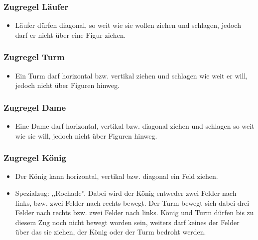 \documentclass[12pt,a4paper]{article}
\begin{document}
{\subsubsection{Zugregel Läufer}
\label{SUBSUBSEC:BISHOP}
\begin{itemize}
	\item{Läufer dürfen diagonal, so weit wie sie wollen ziehen und schlagen, jedoch darf er nicht über eine Figur ziehen.}
\end{itemize}

\subsubsection{Zugregel Turm}
\label{SUBSUBSEC:ROOK}
\begin{itemize}
	\item{Ein Turm darf horizontal bzw. vertikal ziehen und schlagen wie weit er will, jedoch nicht über Figuren hinweg.}
\end{itemize}

\subsubsection{Zugregel Dame}
\label{SUBSUBSEC:QUEEN}
\begin{itemize}
	\item{Eine Dame darf horizontal, vertikal bzw. diagonal ziehen und schlagen so weit wie sie will, jedoch nicht über Figuren hinweg.}
\end{itemize}

\subsubsection{Zugregel König}
\label{SUBSUBSEC:KING}
\begin{itemize}
	\item{Der König kann horizontal, vertikal bzw. diagonal ein Feld ziehen.}
	\item{Spezialzug: ,,Rochade''. Dabei wird der König entweder zwei Felder nach links, bzw. zwei Felder nach rechts bewegt. Der Turm bewegt sich dabei drei Felder nach rechts bzw. zwei Felder nach links. König und Turm dürfen bis zu diesem Zug noch nicht bewegt worden sein, weiters darf keines der Felder über das sie ziehen, der König oder der Turm bedroht werden.}
\end{itemize}



}
\end{document}
